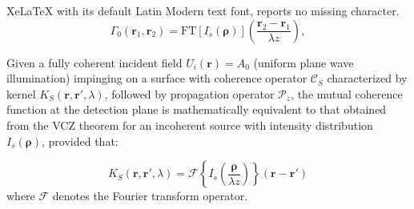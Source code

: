 \documentclass[10pt,a4paper]{amsart}
\begin{document}
XeLaTeX with its default Latin Modern text font, reports no missing character.
\begin{equation}
\Gamma_0(\bm{r}_1, \bm{r}_2) = \mathrm{FT}\left[ I_s(\bm{\rho}) \right] \left( \frac{\bm{r}_2 - \bm{r}_1}{\lambda z} \right),
\label{eq:mutual_coherence}
\end{equation}

\begin{theorem}
Given a fully coherent incident field $U_i(\mathbf{r}) = A_0$ (uniform plane wave illumination) impinging on a 
surface with coherence operator $\mathcal{C}_S$ characterized by kernel $K_S(\mathbf{r}, \mathbf{r}', \lambda)$, 
followed by propagation operator $\mathcal{P}_z$, the mutual coherence function at the detection plane is mathematically 
equivalent to that obtained from the VCZ theorem for an incoherent source with intensity distribution $I_s(\mathbf{\rho})$, 
provided that:

\begin{equation}
K_S(\mathbf{r}, \mathbf{r}', \lambda) = \mathcal{F}\left\{I_s\left(\frac{\mathbf{\rho}}{\lambda z}\right)\right\}(\mathbf{r} - \mathbf{r}')
\end{equation}
where $\mathcal{F}$ denotes the Fourier transform operator.
\end{theorem}
\end{document}

